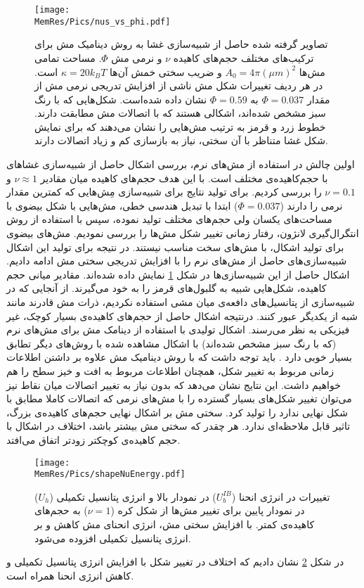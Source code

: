 \begin{figure}[htbp]
\begin{center}
\texttt{[image: \\MemRes/Pics/nus\_vs\_phi.pdf]}
\caption{
تصاویر گرفته شده حاصل از شبیه‌سازی غشا به روش دینامیک مش برای ترکیب‌های مختلف حجم‌های کاهیده‌
 $\nu$
و نرمی مش
$\Phi$.
مساحت تمامی‌ مش‌ها 
$A_0=4\pi (\mu m)^2$
و ضریب سختی خمش آن‌ها
$\kappa=20k_BT$
است. در هر ردیف تغییرات شکل مش ناشی از افزایش تدریجی نرمی مش از مقدار
$\Phi=0.037$
به
$\Phi=0.59$
نشان داده شده‌است. شکل‌هایی که با رنگ سبز مشخص شده‌اند، اشکالی هستند که با اتصالات مش مطابقت دارند. خطوط زرد و قرمز به ترتیب مش‌هایی را نشان می‌دهند که برای نمایش شکل غشا متناظر با آن سختی، نیاز به بازسازی کم و زیاد اتصالات دارند.
}
\label{fig:nuShapes}
\end{center}
\end{figure}

اولین چالش  در استفاده از مش‌های نرم، بررسی اشکال حاصل از شبیه‌سازی غشاهای با حجم‌کاهیده‌ی مختلف است. با این هدف حجم‌های کاهیده‌ میان مقادیر
$\nu \approx 1$
و
 $\nu = 0.1$
را بررسی کردیم. برای تولید نتایج برای شبیه‌سازی مِش‌هایی که کمترین مقدار نرمی را دارند
($\Phi=0.037$)
ابتدا با تبدیل هندسی خطی، مش‌هایی با شکل بیضوی با مساحت‌های یکسان ولی حجم‌های مختلف تولید نموده، سپس با استفاده از روش انتگرال‌گیری لانژون، رفتار زمانی تغییر شکل مش‌ها را بررسی نمودیم. مش‌های بیضوی برای تولید اشکال، با مش‌های سخت مناسب نیستند. در نتیجه برای تولید این اشکال شبیه‌سازی‌های حاصل از مش‌های نرم را با افزایش تدریجی سختی مش ادامه دادیم. اشکال حاصل از این شبیه‌سازی‌ها در شکل
\ref{fig:nuShapes}
نمایش داده‌ شده‌اند. مقادیر میانی حجم کاهیده، شکل‌هایی شبیه به گلبول‌های قرمز را به خود می‌گیرند. از آنجایی که در شبیه‌سازی از پتانسیل‌های دافعه‌ی میان مشی استفاده نکردیم، ذرات مش‌ قادرند مانند شبه  از یکدیگر عبور کنند. درنتیجه اشکال حاصل از حجم‌های کاهیده‌ی بسیار کوچک، غیر فیزیکی به نظر می‌رسند. اشکال تولیدی با استفاده از دینامک مش برای مش‌های نرم (که با رنگ سبز مشخص شده‌اند) با اشکال مشاهده شده با روش‌های دیگر تطابق بسیار خوبی دارد
\cite{Peskin972JourCompPhys, Thomas1979AIAA, Chimera1986, Drabik2016, BIAN2020}.
باید توجه داشت که با روش دینامیک مش علاوه بر داشتن اطلاعات زمانی مربوط به تغییر شکل، همچنان اطلاعات مربوط به افت و خیز سطح را هم خواهیم داشت. این نتایج نشان می‌دهد که بدون نیاز به تغییر اتصالات میان نقاط نیز می‌توان تغییر شکل‌های بسیار گسترده را با مش‌های نرمی که اتصالات کاملا مطابق با شکل نهایی ندارد را تولید کرد. سختی مش بر اشکال نهایی حجم‌های کاهیده‌ی بزرگ، تاثیر قابل ملاحظه‌ای ندارد. هر چقدر که سختی مش بیشتر باشد، اختلاف در اشکال با حجم کاهیده‌ی کوچکتر زودتر اتفاق می‌افتد.

\begin{figure}[h]
\begin{center}
\texttt{[image: \\MemRes/Pics/shapeNuEnergy.pdf]}
\caption{
تغییرات در انرژی انحنا 
($U_b^{IB}$)
در نمودار بالا و انرژی پتانسیل تکمیلی
($U_h$)
در نمودار پایین برای تغییر مش‌ها از شکل کره
($\nu=1$)
به حجم‌های کاهیده‌ی کمتر. با افزایش سختی مش، انرژی انحنای مش کاهش و بر انرژی پتانسیل تکمیلی افزوده می‌شود.
}
\label{fig:UhvsNu}
\end{center}
\end{figure}


در شکل 
\ref{fig:UhvsNu}
نشان دادیم که اختلاف در تغییر شکل با افزایش انرژی پتانسیل تکمیلی و کاهش انرژی انحنا همراه است.


